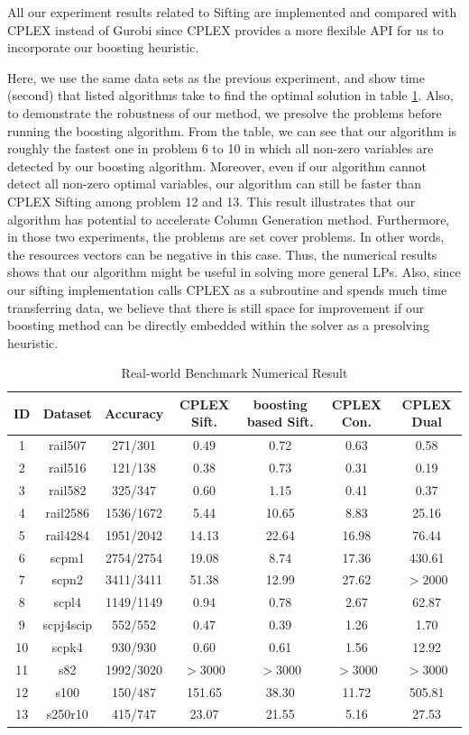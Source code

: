 \documentclass{article} %
\begin{document}
\begin{remark}
All our experiment results related to Sifting are implemented and compared with CPLEX instead of Gurobi since CPLEX provides a more flexible API for us to incorporate our boosting heuristic.
\end{remark}

Here, we use the same data sets as the previous experiment, and show time (second) that listed algorithms take to find the optimal solution in table \ref{tab:sifting}. Also, to demonstrate the robustness of our method, we presolve the problems before running the boosting algorithm.
From the table, we can see that our algorithm is roughly the fastest one in problem 6 to 10 in which all non-zero variables are detected by our boosting algorithm. Moreover, even if our algorithm cannot detect all non-zero optimal variables, our algorithm can still be faster than CPLEX Sifting among problem 12 and 13. This result illustrates that our algorithm has potential to accelerate Column Generation method. Furthermore, in those two experiments, the problems are set cover problems. In other words, the resources vectors can be negative in this case. Thus, the numerical results shows that our algorithm might be useful in solving more general LPs. Also, since our sifting implementation calls CPLEX as a subroutine and spends much time transferring data, we believe that there is still space for improvement if our boosting method can be directly embedded within the solver as a presolving heuristic.

\begin{table}[ht!]
\small
\label{tab:sifting}
\centering
\begin{tabular}{c|c|c|c|c|c|c}
  \hline
  ID &Dataset & Accuracy & CPLEX Sift. & boosting based Sift. & CPLEX Con. & CPLEX Dual\\
  \hline
  1& rail507 & 271/301 & 0.49 & 0.72 & 0.63 & 0.58\\
  2& rail516 & 121/138 & 0.38 & 0.73 & 0.31 & 0.19\\
  3& rail582 & 325/347 &0.60  & 1.15 & 0.41 & 0.37\\
  4& rail2586 & 1536/1672 &5.44 & 10.65 & 8.83 & 25.16\\
  5& rail4284 & 1951/2042 &14.13 & 22.64 & 16.98 & 76.44 \\
  6& scpm1 & 2754/2754 &19.08 & 8.74 & 17.36 & 430.61\\
  7& scpn2 & 3411/3411 &51.38 & 12.99 & 27.62 & $>2000$\\
  8& scpl4 & 1149/1149 &0.94 & 0.78 & 2.67& 62.87\\
  9& scpj4scip & 552/552 &0.47 & 0.39 & 1.26& 1.70\\
  10& scpk4 & 930/930 &0.60 & 0.61 & 1.56& 12.92\\
  11& s82 & 1992/3020 & $>$3000 & $>$3000 & $>$3000 & $>$3000\\
  12& s100 & 150/487 &151.65 & 38.30 & 11.72& 505.81 \\
  13& s250r10 & 415/747 &23.07 & 21.55 & 5.16 & 27.53\\
  \hline
\end{tabular}
\caption{Real-world Benchmark Numerical Result}


\end{table}
\end{document}
